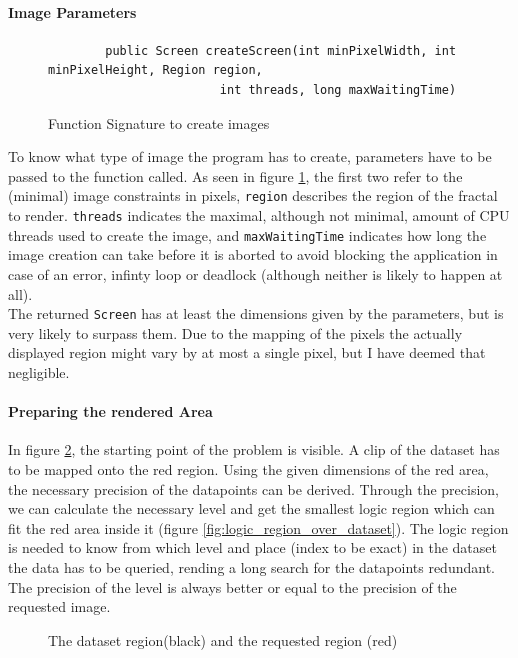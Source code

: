 \documentclass[10pt,a4paper,titlepage]{article}
\begin{document}
	\paragraph{Image Parameters}
	\begin{figure}
		\centering
		\caption{Function Signature to create images}
		\label{fig:image_signature}
		\begin{verbatim}
		public Screen createScreen(int minPixelWidth, int minPixelHeight, Region region,
		                int threads, long maxWaitingTime)
		\end{verbatim}
	\end{figure}
	To know what type of image the program has to create, parameters have to be passed to the function called. As seen in figure \ref{fig:image_signature}, the first two refer to the (minimal) image constraints in pixels, \verb|region| describes the region of the fractal to render. \verb|threads| indicates the maximal, although not minimal, amount of CPU threads used to create the image, and \verb|maxWaitingTime| indicates how long the image creation can take before it is aborted to avoid blocking the application in case of an error, infinty loop or deadlock (although neither is likely to happen at all).\\
	The returned \verb|Screen| has at least the dimensions given by the parameters, but is very likely to surpass them. Due to the mapping of the pixels the actually displayed region might vary by at most a single pixel, but I have deemed that negligible.	
	\paragraph{Preparing the rendered Area}
	In figure \ref{fig:region_over_dataset}, the starting point of the problem is visible. A clip of the dataset has to be mapped onto the red region. Using the given dimensions of the red area, the necessary precision of the datapoints can be derived. Through the precision, we can calculate the necessary level and get the smallest logic region which can fit the red area inside it (figure \ref{fig:logic_region_over_dataset}). The logic region is needed to know from which level and place (index to be exact) in the dataset the data has to be queried, rending a long search for the datapoints redundant. The precision of the level is always better or equal to the precision of the requested image.	
	\begin{figure}
	\centering
	\caption{The dataset region(black) and the requested region (red)}
	\label{fig:region_over_dataset}
	\end{figure}
	
\end{document}
